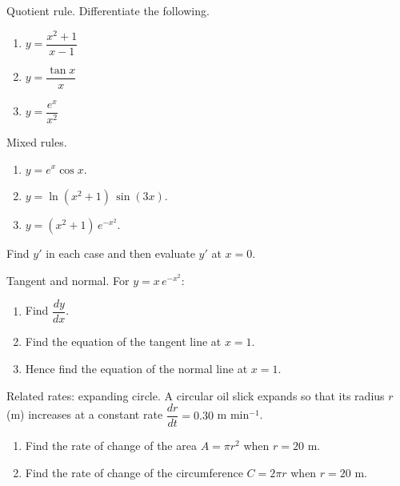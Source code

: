 \documentclass[11pt]{article}
\def\textbf#1{#1}%
\newcounter{question}
\begin{document}
\begin{question}
\textbf{Quotient rule.} Differentiate the following.
\begin{enumerate}
  \item $y=\dfrac{x^{2}+1}{x-1}$
  \item $y=\dfrac{\tan x}{x}$
  \item $y=\dfrac{e^{x}}{x^{2}}$
\end{enumerate}
\end{question}

\begin{question}
\textbf{Mixed rules.}
\begin{enumerate}
  \item $y=e^{x}\cos x$.
  \item $y=\ln(x^{2}+1)\,\sin(3x)$.
  \item $y=(x^{2}+1)\,e^{-x^{2}}$.
\end{enumerate}
Find $y'$ in each case and then evaluate $y'$ at $x=0$.
\end{question}

\begin{question}
\textbf{Tangent and normal.} For $y=x\,e^{-x^{2}}$:
\begin{enumerate}
  \item Find $\dfrac{dy}{dx}$.
  \item Find the equation of the tangent line at $x=1$.
  \item Hence find the equation of the normal line at $x=1$.
\end{enumerate}
\end{question}

\begin{question}
\textbf{Related rates: expanding circle.} A circular oil slick expands so that its radius $r$ (m) increases at a constant rate $\dfrac{dr}{dt}=0.30$ m min$^{-1}$. 
\begin{enumerate}
  \item Find the rate of change of the area $A=\pi r^{2}$ when $r=20$ m.
  \item Find the rate of change of the circumference $C=2\pi r$ when $r=20$ m.
\end{enumerate}

\begin{center}
\end{center}
\end{question}
\end{document}
